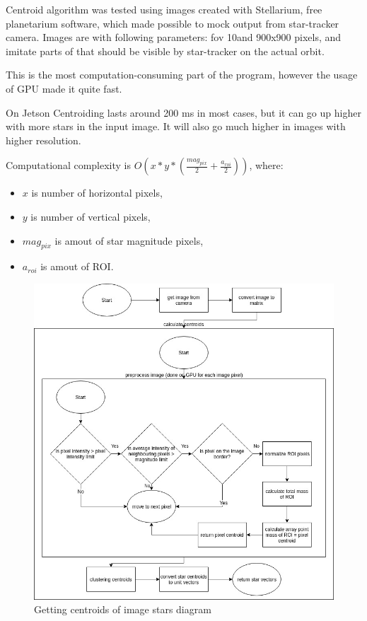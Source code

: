 \documentclass[12pt,a4paper,twoside]{article}
\begin{document}
Centroid algorithm was tested using images created with Stellarium, free planetarium software, which made possible to mock output from star-tracker camera. Images are with following parameters: \gls{fov} 10\degree and 900x900 pixels, and imitate parts of that should be visible by star-tracker on the actual orbit.

This is the most computation-consuming part of the program, however the usage of GPU made it quite fast.

On Jetson Centroiding lasts around 200 ms in most cases, but it can go up higher with more stars in the input image. It will also go much higher in images with higher resolution.

Computational complexity is $O(x*y*(\frac{mag_{pix}}{2}+\frac{a_{roi}}{2}))$, where:
\begin{itemize}[noitemsep]
\item $x$ is number of horizontal pixels,
\item $y$ is number of vertical pixels,
\item $mag_{pix}$ is amout of star magnitude pixels,
\item $a_{roi}$ is amout of ROI.
\end{itemize}

\begin{figure}[!htbp]
\includegraphics[scale=0.51]{get_image_stars_diagram.jpg}
\centering
\caption{Getting centroids of image stars diagram}
\label{fig:get_image_stars_diagram}
\end{figure}
\end{document}

